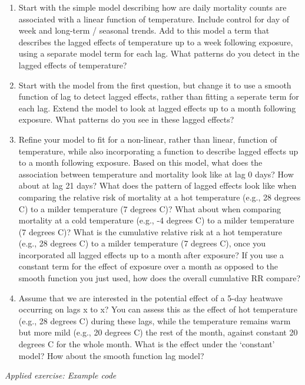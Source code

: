 \documentclass[
]{book}
\providecommand{\tightlist}{%
  \setlength{\itemsep}{0pt}\setlength{\parskip}{0pt}}
\begin{document}
\begin{enumerate}
\def\labelenumi{\arabic{enumi}.}
\tightlist
\item
  Start with the simple model describing how are daily mortality counts are
  associated with a linear function of temperature. Include control for day of
  week and long-term / seasonal trends. Add to this model a term that describes
  the lagged effects of temperature up to a week following exposure, using a
  separate model term for each lag. What patterns do you detect in the lagged
  effects of temperature?
\item
  Start with the model from the first question, but change it to use a smooth
  function of lag to detect lagged effects, rather than fitting a seperate term
  for each lag. Extend the model to look at lagged effects up to a month following
  exposure. What patterns do you see in these lagged effects?
\item
  Refine your model to fit for a non-linear, rather than linear, function
  of temperature, while also incorporating a function to describe lagged effects up
  to a month following exposure. Based on this model, what does the association
  between temperature and mortality look like at lag 0 days? How about at lag 21 days?
  What does the pattern of lagged effects look like when comparing the relative risk of
  mortality at a hot temperature (e.g., 28 degrees C) to a milder temperature
  (7 degrees C)? What about when comparing mortality at a cold temperature
  (e.g., -4 degrees C) to a milder temperature (7 degrees C)? What is the
  cumulative relative risk at a hot temperature (e.g., 28 degrees C) to a
  milder temperature (7 degrees C), once you incorporated all lagged effects
  up to a month after exposure? If you use a constant term for the effect of exposure
  over a month as opposed to the smooth function you just used, how does the overall
  cumulative RR compare?
\item
  Assume that we are interested in the potential effect of a 5-day
  heatwave occurring on lags x to x? You can assess this as the effect of hot temperature
  (e.g., 28 degrees C) during these lags, while the temperature remains warm but more
  mild (e.g., 20 degrees C) the rest of the month, against constant 20 degrees C for
  the whole month. What is the effect under the `constant' model? How about the smooth
  function lag model?
\end{enumerate}

\emph{Applied exercise: Example code}
\end{document}
